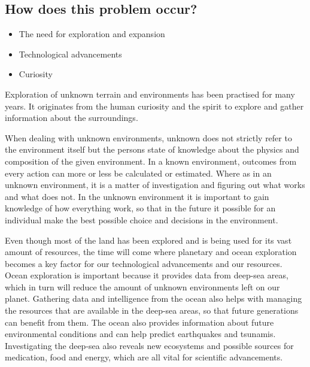 \subsection{How does this problem occur?}
\begin{itemize}
	\item The need for exploration and expansion
	\item Technological advancements
	\item Curiosity
\end{itemize}

Exploration of unknown terrain and environments has been practised for many years. It originates from the human curiosity and the spirit to explore and gather information about the surroundings. %

When dealing with unknown environments, unknown does not strictly refer to the environment itself but the persons state of knowledge about the physics and composition of the given environment. In a known environment, outcomes from every action can more or less be calculated or estimated. Where as in an unknown environment, it is a matter of investigation and figuring out what works and what does not. In the unknown environment it is important to gain knowledge of how everything work, so that in the future it possible for an individual make the best possible choice and decisions in the environment.

Even though most of the land has been explored and is being used for its vast amount of resources, the time will come where planetary and ocean exploration becomes a key factor for our technological advancements and our resources. Ocean exploration is important because it provides data from deep-sea areas, which in turn will reduce the amount of unknown environments left on our planet.
Gathering data and intelligence from the ocean also helps with managing the resources that are available in the deep-sea areas, so that future generations can benefit from them. The ocean also provides information about future environmental conditions and can help predict earthquakes and tsunamis. Investigating the deep-sea also reveals new ecosystems and possible sources for medication, food and energy, which are all vital for scientific advancements. 

